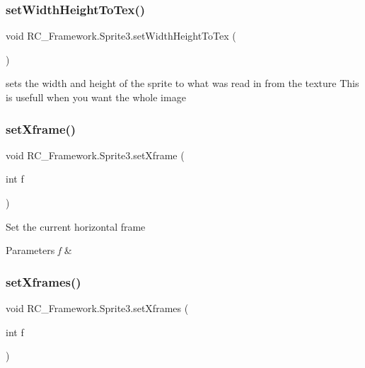\subsubsection{\texorpdfstring{set\+Width\+Height\+To\+Tex()}{setWidthHeightToTex()}}
{\footnotesize\ttfamily void R\+C\+\_\+\+Framework.\+Sprite3.\+set\+Width\+Height\+To\+Tex (\begin{DoxyParamCaption}{ }\end{DoxyParamCaption})}



sets the width and height of the sprite to what was read in from the texture This is usefull when you want the whole image 

\mbox{\label{class_r_c___framework_1_1_sprite3_a56a7afacc321c80d0dfb1d9c5933f7df}} 
\subsubsection{\texorpdfstring{set\+Xframe()}{setXframe()}}
{\footnotesize\ttfamily void R\+C\+\_\+\+Framework.\+Sprite3.\+set\+Xframe (\begin{DoxyParamCaption}\item[{int}]{f }\end{DoxyParamCaption})}



Set the current horizontal frame 


\begin{DoxyParams}{Parameters}
{\em f} & \\
\hline
\end{DoxyParams}
\mbox{\label{class_r_c___framework_1_1_sprite3_aab8c41c05cad46205425cfdb86b60e56}} 
\subsubsection{\texorpdfstring{set\+Xframes()}{setXframes()}}
{\footnotesize\ttfamily void R\+C\+\_\+\+Framework.\+Sprite3.\+set\+Xframes (\begin{DoxyParamCaption}\item[{int}]{f }\end{DoxyParamCaption})}



